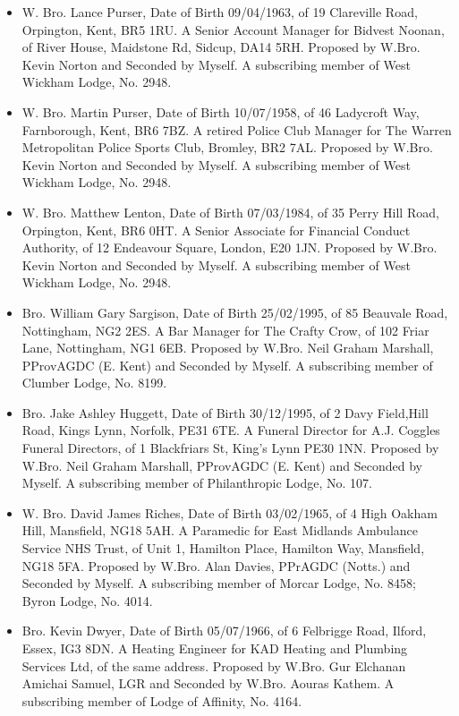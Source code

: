 \documentclass{lodgebrand}
\begin{document}
\begin{itemize}
  \item W. Bro. Lance Purser, Date of Birth 09/04/1963, of 19 Clareville Road, Orpington, Kent, BR5 1RU. A Senior Account Manager for Bidvest Noonan, of River House, Maidstone Rd, Sidcup, DA14 5RH. Proposed by W.Bro. Kevin Norton and Seconded by Myself. A subscribing member of West Wickham Lodge, No. 2948.
  \item W. Bro. Martin Purser, Date of Birth 10/07/1958, of 46 Ladycroft Way, Farnborough, Kent, BR6 7BZ. A retired Police Club Manager for The Warren Metropolitan Police Sports Club, Bromley, BR2 7AL. Proposed by W.Bro. Kevin Norton and Seconded by Myself. A subscribing member of West Wickham Lodge, No. 2948.
  \item W. Bro. Matthew Lenton, Date of Birth 07/03/1984, of 35 Perry Hill Road, Orpington, Kent, BR6 0HT. A Senior Associate for Financial Conduct Authority, of 12 Endeavour Square, London, E20 1JN. Proposed by W.Bro. Kevin Norton and Seconded by Myself. A subscribing member of West Wickham Lodge, No. 2948.
  \item Bro. William Gary Sargison, Date of Birth 25/02/1995, of 85 Beauvale Road, Nottingham, NG2 2ES. A Bar Manager for The Crafty Crow, of 102 Friar Lane, Nottingham, NG1 6EB. Proposed by W.Bro. Neil Graham Marshall, PProvAGDC (E. Kent) and Seconded by Myself. A subscribing member of Clumber Lodge, No. 8199.
  \item Bro. Jake Ashley Huggett, Date of Birth 30/12/1995, of 2 Davy Field,Hill Road, Kings Lynn, Norfolk, PE31 6TE. A Funeral Director for A.J. Coggles Funeral Directors, of 1 Blackfriars St, King's Lynn PE30 1NN. Proposed by W.Bro. Neil Graham Marshall, PProvAGDC (E. Kent) and Seconded by Myself. A subscribing member of Philanthropic Lodge, No. 107.
  \item W. Bro. David James Riches, Date of Birth 03/02/1965, of 4 High Oakham Hill, Mansfield, NG18 5AH. A Paramedic for East Midlands Ambulance Service NHS Trust, of Unit 1, Hamilton Place, Hamilton Way, Mansfield, NG18 5FA. Proposed by W.Bro. Alan Davies, PPrAGDC (Notts.) and Seconded by Myself. A subscribing member of Morcar Lodge, No. 8458; Byron Lodge, No. 4014.
  \item Bro. Kevin Dwyer, Date of Birth 05/07/1966, of 6 Felbrigge Road, Ilford, Essex, IG3 8DN. A Heating Engineer for KAD Heating and Plumbing Services Ltd, of the same address. Proposed by W.Bro. Gur Elchanan Amichai Samuel, LGR and Seconded by W.Bro. Aouras Kathem. A subscribing member of Lodge of Affinity, No. 4164.

\end{itemize}
\end{document}

